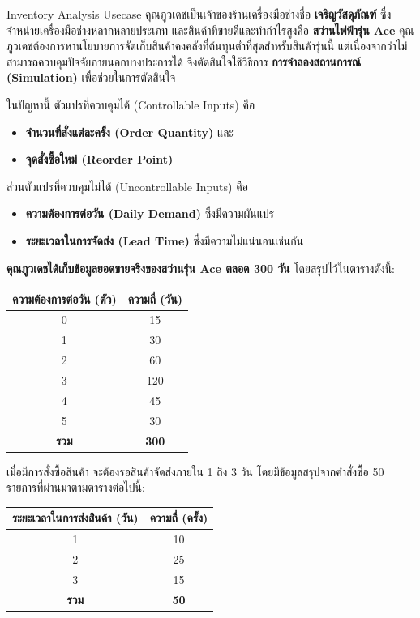 \begin{example}
    {Inventory Analysis Usecase}{}
    คุณภูวเดชเป็นเจ้าของร้านเครื่องมือช่างชื่อ \textbf{เจริญวัสดุภัณฑ์} ซึ่งจำหน่ายเครื่องมือช่างหลากหลายประเภท และสินค้าที่ขายดีและทำกำไรสูงคือ \textbf{สว่านไฟฟ้ารุ่น Ace} คุณภูวเดชต้องการหานโยบายการจัดเก็บสินค้าคงคลังที่ต้นทุนต่ำที่สุดสำหรับสินค้ารุ่นนี้ แต่เนื่องจากว่าไม่สามารถควบคุมปัจจัยภายนอกบางประการได้ จึงตัดสินใจใช้วิธีการ \textbf{การจำลองสถานการณ์ (Simulation)} เพื่อช่วยในการตัดสินใจ

ในปัญหานี้ ตัวแปรที่ควบคุมได้ (Controllable Inputs) คือ
\begin{itemize}
    \item \textbf{จำนวนที่สั่งแต่ละครั้ง (Order Quantity)} และ 
    \item \textbf{จุดสั่งซื้อใหม่ (Reorder Point)}
\end{itemize}
ส่วนตัวแปรที่ควบคุมไม่ได้ (Uncontrollable Inputs) คือ
\begin{itemize}
    \item \textbf{ความต้องการต่อวัน (Daily Demand)} ซึ่งมีความผันแปร
    \item \textbf{ระยะเวลาในการจัดส่ง (Lead Time)} ซึ่งมีความไม่แน่นอนเช่นกัน
\end{itemize}

\textbf{คุณภูวเดชได้เก็บข้อมูลยอดขายจริงของสว่านรุ่น Ace ตลอด 300 วัน} โดยสรุปไว้ในตารางดังนี้:

\begin{center}
\begin{tabular}{|c|c|}
\hline
\textbf{ความต้องการต่อวัน (ตัว)} & \textbf{ความถี่ (วัน)} \\
\hline
0 & 15 \\
1 & 30 \\
2 & 60 \\
3 & 120 \\
4 & 45 \\
5 & 30 \\
\hline
\textbf{รวม} & \textbf{300} \\
\hline
\end{tabular}
\end{center}

เมื่อมีการสั่งซื้อสินค้า จะต้องรอสินค้าจัดส่งภายใน 1 ถึง 3 วัน โดยมีข้อมูลสรุปจากคำสั่งซื้อ 50 รายการที่ผ่านมาตามตารางต่อไปนี้:

\begin{center}
\begin{tabular}{|c|c|}
\hline
\textbf{ระยะเวลาในการส่งสินค้า (วัน)} & \textbf{ความถี่ (ครั้ง)} \\
\hline
1 & 10 \\
2 & 25 \\
3 & 15 \\
\hline
\textbf{รวม} & \textbf{50} \\
\hline
\end{tabular}
\end{center}


\end{example}
